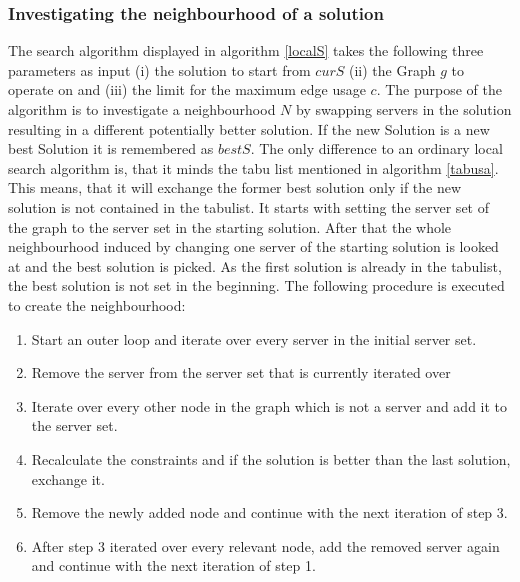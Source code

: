 \documentclass [12pt]{article}
\begin{document}
\subsubsection{Investigating the neighbourhood of a solution }
The search algorithm displayed in algorithm \ref{localS} takes
the following three parameters as input (i) the solution to start from $curS$
(ii) the Graph $g$ to operate on and (iii) the limit for the maximum edge usage $c$.
The purpose of the algorithm is to investigate a neighbourhood $N$ by swapping servers in the solution
resulting in a different potentially better solution. If the new Solution is a new best Solution it is remembered as $bestS$.
The only difference to an ordinary local search algorithm is, that it minds the tabu list mentioned in algorithm \ref{tabusa}.
This means, that it will exchange the former best solution only if the new solution is not contained in the tabulist.
It starts with setting the server set of the graph to the server set in the starting solution. After that the whole
neighbourhood induced by changing one server of the starting solution is looked at and the best solution is picked. As the first solution
is already in the tabulist, the best solution is not set in the beginning.
The following procedure is executed to create the neighbourhood:
\begin{enumerate}
  \item{Start an outer loop and iterate over every server in the initial server set.}
  \item{Remove the server from the server set that is currently iterated over}
  \item{Iterate over every other node in the graph which is not a server and add it to the server set.}
  \item{Recalculate the constraints and if the solution is better than the last solution, exchange it.}
  \item{Remove the newly added node and continue with the next iteration of step 3.}
  \item{After step 3 iterated over every relevant node, add the removed server again and continue with the next iteration of step 1.}
\end{enumerate}
\end{document}
